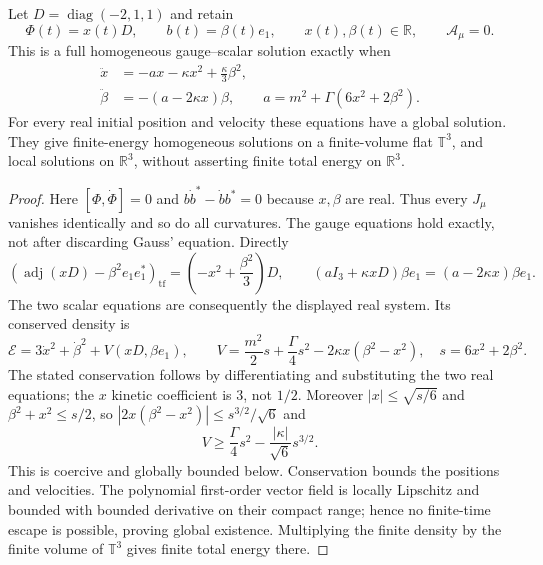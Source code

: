\begin{theorem}
\label{q444:radial-gauge}
Let $D=\operatorname{diag}(-2,1,1)$ and retain
\[
 \Phi(t)=x(t)D,\qquad b(t)=\beta(t)e_1,\qquad
 x(t),\beta(t)\in\mathbb R,\qquad \mathcal A_\mu=0.
\]
This is a full homogeneous gauge--scalar solution exactly when
\begin{align*}
 \ddot x&=-a x-\kappa x^2+\frac{\kappa}{3}\beta^2,\\
 \ddot\beta&=-(a-2\kappa x)\beta,\qquad
 a=m^2+\Gamma(6x^2+2\beta^2).
\end{align*}
For every real initial position and velocity these equations have a
global solution. They give finite-energy homogeneous solutions on a
finite-volume flat $\mathbb T^3$, and local solutions on $\mathbb R^3$,
without asserting finite total energy on $\mathbb R^3$.
\end{theorem}
\begin{proof}
Here $[\Phi,\dot\Phi]=0$ and
$b\dot b^*-\dot b b^*=0$ because $x,\beta$ are real.
Thus every $J_\mu$ vanishes identically and so do all curvatures.
The gauge equations hold exactly, not after discarding Gauss' equation.
Directly
\[
 (\operatorname{adj}(xD)-\beta^2e_1e_1^*)_{\mathrm{tf}}
          =\left(-x^2+\frac{\beta^2}{3}\right)D,\qquad
 (aI_3+\kappa xD)\beta e_1=(a-2\kappa x)\beta e_1.
\]
The two scalar equations are consequently the displayed real system.
Its conserved density is
\[
 \mathcal E=3\dot x^2+\dot\beta^2+
 V(xD,\beta e_1),\qquad
 V=\frac{m^2}{2}s+\frac{\Gamma}{4}s^2
               -2\kappa x(\beta^2-x^2),\quad s=6x^2+2\beta^2.
\]
The stated conservation follows by differentiating and substituting the
two real equations; the $x$ kinetic coefficient is $3$, not $1/2$.
Moreover $|x|\le\sqrt{s/6}$ and $\beta^2+x^2\le s/2$, so
$|2x(\beta^2-x^2)|\le s^{3/2}/\sqrt6$ and
\[
 V\ge\frac{\Gamma}{4}s^2-\frac{|\kappa|}{\sqrt6}s^{3/2}.
\]
This is coercive and globally bounded below. Conservation bounds the
positions and velocities. The polynomial first-order vector field is
locally Lipschitz and bounded with bounded derivative on their compact
range; hence no finite-time escape is possible, proving global existence.
Multiplying the finite density by the finite volume of $\mathbb T^3$
gives finite total energy there.
\end{proof}

